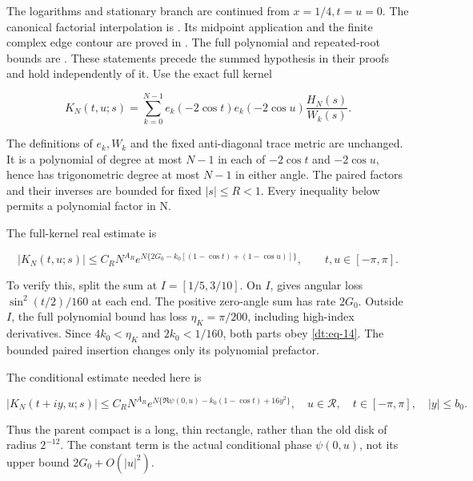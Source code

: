 The logarithms and stationary branch are continued from
\(x=1/4,t=u=0\). The canonical factorial interpolation is \cite[Lemma~2.1]{Factorial}.
Its midpoint application and the finite complex edge contour are proved
in \cite[Section~3]{Summed}. The full polynomial and repeated-root
bounds are \cite[Lemma~2.1]{Summed}. These statements precede the
summed hypothesis in their proofs and hold independently of it.
Use the exact full kernel

\begin{equation}\label{dt:eq-13}
K_N(t,u;s)=\sum_{k=0}^{N-1}
       e_k(-2\cos t)e_k(-2\cos u)\frac{H_N(s)}{W_k(s)}.
\end{equation}

The definitions of \(e_k,W_k\) and the fixed anti-diagonal trace metric are
unchanged. It is a polynomial of degree at most \(N-1\) in each of
\(-2\cos t\) and \(-2\cos u\), hence has trigonometric degree at most
\(N-1\) in either angle.
The paired factors and their inverses are bounded for fixed \(|s|\le R<1\).
Every inequality below permits a polynomial factor in N.

The full-kernel real estimate is

\begin{equation}\label{dt:eq-14}
|K_N(t,u;s)|\le C_RN^{A_R}
   e^{N\{2G_0-k_0[(1-\cos t)+(1-\cos u)]\}},
                 \qquad t,u\in[-\pi,\pi].
\end{equation}

To verify this, split the sum at \(I=[1/5,3/10]\).
On \(I\), \cite[equation~(4.1)]{Summed} gives angular loss
\(\sin^2(t/2)/160\) at each end. The positive zero-angle sum
has rate \(2G_0\). Outside \(I\), the full polynomial bound
has loss \(\eta_K=\pi/200\), including high-index derivatives.
Since \(4k_0<\eta_K\) and \(2k_0<1/160\), both parts obey
\eqref{dt:eq-14}. The bounded paired insertion changes only its
polynomial prefactor.

The conditional estimate needed here is

\begin{equation}\label{dt:eq-15}
|K_N(t+iy,u;s)|\le C_RN^{A_R}
 e^{N\{\Re\psi(0,u)-k_0(1-\cos t)+16y^2\}},
 \quad u\in\mathcal R,\quad t\in[-\pi,\pi],\quad |y|\le b_0.
\end{equation}

Thus the parent compact is a long, thin rectangle, rather than the old
disk of radius \(2^{-12}\). The constant term is the actual conditional phase
\(\psi(0,u)\), not its upper bound \(2G_0+O(|u|^2)\).

